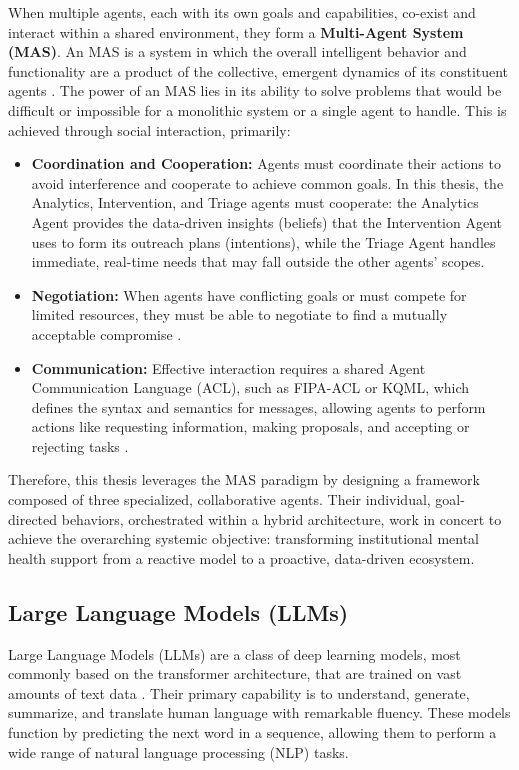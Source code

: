 When multiple agents, each with its own goals and capabilities, co-exist and interact within a shared environment, they form a \textbf{Multi-Agent System (MAS)}. An MAS is a system in which the overall intelligent behavior and functionality are a product of the collective, emergent dynamics of its constituent agents \cite{FIND_CITATION_PLEASE}. The power of an MAS lies in its ability to solve problems that would be difficult or impossible for a monolithic system or a single agent to handle. This is achieved through social interaction, primarily:
\begin{itemize}
    \item \textbf{Coordination and Cooperation:} Agents must coordinate their actions to avoid interference and cooperate to achieve common goals. In this thesis, the Analytics, Intervention, and Triage agents must cooperate: the Analytics Agent provides the data-driven insights (beliefs) that the Intervention Agent uses to form its outreach plans (intentions), while the Triage Agent handles immediate, real-time needs that may fall outside the other agents' scopes.
    \item \textbf{Negotiation:} When agents have conflicting goals or must compete for limited resources, they must be able to negotiate to find a mutually acceptable compromise \cite{FIND_CITATION_PLEASE}.
    \item \textbf{Communication:} Effective interaction requires a shared Agent Communication Language (ACL), such as FIPA-ACL or KQML, which defines the syntax and semantics for messages, allowing agents to perform actions like requesting information, making proposals, and accepting or rejecting tasks \cite{FIND_CITATION_PLEASE}.
\end{itemize}
Therefore, this thesis leverages the MAS paradigm by designing a framework composed of three specialized, collaborative agents. Their individual, goal-directed behaviors, orchestrated within a hybrid architecture, work in concert to achieve the overarching systemic objective: transforming institutional mental health support from a reactive model to a proactive, data-driven ecosystem.

\subsection{Large Language Models (LLMs)}
\label{subsec:llms}

Large Language Models (LLMs) are a class of deep learning models, most commonly based on the transformer architecture, that are trained on vast amounts of text data \cite{FIND_CITATION_PLEASE}. Their primary capability is to understand, generate, summarize, and translate human language with remarkable fluency. These models function by predicting the next word in a sequence, allowing them to perform a wide range of natural language processing (NLP) tasks.

